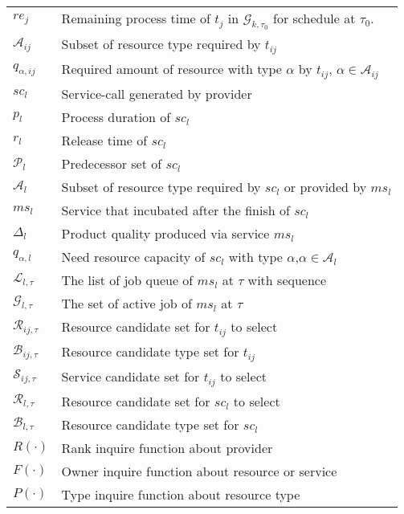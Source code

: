 \begin{table}[htbp]
\begin{tabularx}{\textwidth}{|lX|}
    $re_j$ & Remaining process time of $t_j$ in $\mathcal{G}_{k,\tau_0}$ for schedule at $\tau_0$. \\
    $\mathcal{A}_{ij}$ & Subset of resource type required by $t_{ij}$\\ %
    $q_{\alpha,ij}$ & Required amount of resource with type $\alpha$ by $t_{ij}$, $\alpha\in\mathcal{A}_{ij}$\\
    $sc_l$ & Service-call generated by provider\\
    $p_l$ & Process duration of $sc_l$\\
    $r_l$ & Release time of $sc_l$\\
    $\mathcal{P}_{l}$ & Predecessor set of $sc_{l}$\\
    $\mathcal{A}_l$ & Subset of resource type required by $sc_l$ or provided by $ms_l$ \\ %
    $ms_l$ & Service that incubated after the finish of $sc_l$\\
    $\Delta_l$ & Product quality produced via service $ms_l$\\
    $q_{\alpha,l}$ & Need resource capacity of $sc_l$ with type $\alpha$,$\alpha\in\mathcal{A}_{l}$\\
    $\mathcal{L}_{l,\tau}$ & The list of job queue of $ms_l$ at $\tau$ with sequence\\
    $\mathcal{G}_{l,\tau}$ & The set of active job of $ms_l$ at $\tau$ \\
    $\mathcal{R}_{ij,\tau}$ & Resource candidate set for $t_{ij}$ to select\\
    $\mathcal{B}_{ij,\tau}$ & Resource candidate type set for $t_{ij}$\\
    $\mathcal{S}_{ij,\tau}$ & Service candidate set for $t_{ij}$ to select\\
    $\mathcal{R}_{l,\tau}$ & Resource candidate set for $sc_l$ to select\\
    $\mathcal{B}_{l,\tau}$ & Resource candidate type set for $sc_l$\\
    $R(\cdot)$ & Rank inquire function about provider\\
    $F(\cdot)$ & Owner inquire function about resource or service\\
    $P(\cdot)$ & Type inquire function about resource type\\
    \hline
\end{tabularx}
\end{table}
